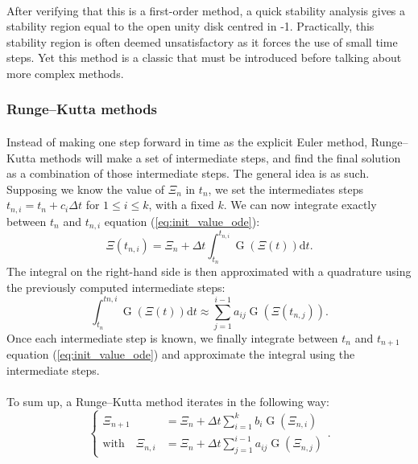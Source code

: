         \paragraph{}
        After verifying that this is a first-order method, a quick stability analysis gives a stability region equal to the open unity disk centred in -1.
        Practically, this stability region is often deemed unsatisfactory as it forces the use of small time steps.
        Yet this method is a classic that must be introduced before talking about more complex methods.


      \subsubsection{Runge--Kutta methods}

        \paragraph{}
        Instead of making one step forward in time as the explicit Euler method, Runge--Kutta methods will make a set of intermediate steps, and find the final solution as a combination of those intermediate steps.
        The general idea is as such.
        Supposing we know the value of $\Xi_n$ in $t_n$, we set the intermediates steps $t_{n, i} = t_n + c_i\Delta t$ for $1 \leq i \leq k$, with a fixed $k$.
        We can now integrate exactly between $t_n$ and $t_{n, i}$ equation (\ref{eq:init_value_ode}):
        \begin{equation}
          \Xi\left(t_{n, i}\right) = \Xi_n + \Delta t \int_{t_n}^{t_{n,i}} \operatorname{G}\left(\Xi\left(t\right)\right) \mathrm{d}t .
        \end{equation}
        The integral on the right-hand side is then approximated with a quadrature using the previously computed intermediate steps:
        \begin{equation}
          \int_{t_n}^{t{n,i}} \operatorname{G}\left(\Xi\left(t\right)\right) \mathrm{d}t \approx \sum_{j = 1}^{i-1} a_{ij} \operatorname{G}\left(\Xi\left(t_{n,j}\right)\right) .
        \end{equation}
        Once each intermediate step is known, we finally integrate between $t_n$ and $t_{n+1}$ equation (\ref{eq:init_value_ode}) and approximate the integral using the intermediate steps.

        \paragraph{}
        To sum up, a Runge--Kutta method iterates in the following way:
        \begin{equation}\label{eq:rk}
          \left\{\begin{aligned}
            \Xi_{n+1} &= \Xi_n + \Delta t \sum_{i = 1}^k b_i \operatorname{G}\left(\Xi_{n,i}\right) \\
            \textrm{with}\quad \Xi_{n,i} &= \Xi_n + \Delta t \sum_{j = 1}^{i-1} a_{ij} \operatorname{G}\left(\Xi_{n,j}\right)
          \end{aligned}\right. .
        \end{equation}

